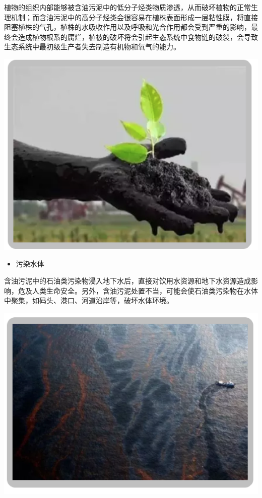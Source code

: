 \documentclass[
]{book}
\providecommand{\tightlist}{%
  \setlength{\itemsep}{0pt}\setlength{\parskip}{0pt}}
\begin{document}
植物的组织内部能够被含油污泥中的低分子烃类物质渗透，从而破坏植物的正常生理机制；而含油污泥中的高分子烃类会很容易在植株表面形成一层粘性膜，将直接阻塞植株的气孔，植株的水吸收作用以及呼吸和光合作用都会受到严重的影响，最终会造成植物根系的腐烂，植被的破坏将会引起生态系统中食物链的破裂，会导致生态系统中最初级生产者失去制造有机物和氧气的能力。

\includegraphics[width=8.33in]{images/youni5}

\begin{itemize}
\tightlist
\item
  污染水体
\end{itemize}

含油污泥中的石油类污染物浸入地下水后，直接对饮用水资源和地下水资源造成影响，危及人类生命安全。另外，含油污泥处置不当，可能会使石油类污染物在水体中聚集，如码头、港口、河道沿岸等，破坏水体环境。

\includegraphics[width=8.33in]{images/youni6}
\end{document}

